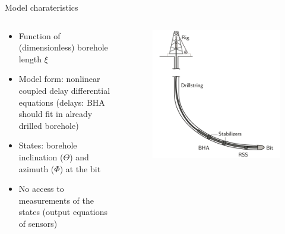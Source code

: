 \documentclass{beamer}
\begin{document}
\begin{frame}{Model charateristics}
\begin{columns}
\begin{column}{0.5\textwidth}
	\begin{itemize}\setlength\itemsep{1em}
	\item Function of (dimensionless) borehole length $\xi$
	\item Model form: nonlinear coupled delay differential equations (delays: BHA should fit in already drilled borehole)
	\item States: borehole inclination ($\Theta$) and azimuth ($\Phi$) at the bit
	\item No access to measurements of the states (output equations of sensors)
	\end{itemize}
\end{column}
	\begin{column}{0.4\textwidth}
	\begin{figure}[ht]\centering
		\includegraphics[width=1.25\textwidth]{images/drillingsystem.pdf}
	\end{figure}
	\end{column}
\end{columns}
\end{frame}
\end{document}
